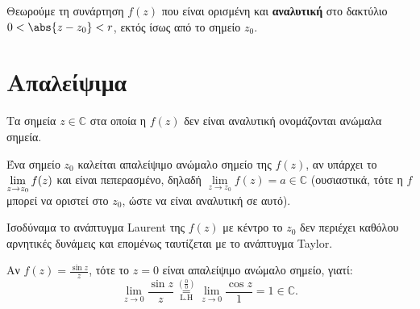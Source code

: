 




\everymath{\displaystyle}
\thispagestyle{empty}







\begin{center}
  \minibox{\large\bfseries \textcolor{Col1}{Ανώμαλα Σημεία}}
\end{center}

\vspace{\baselineskip} 

Θεωρούμε τη συνάρτηση $f(z)$ που είναι ορισμένη και \textbf{αναλυτική} στο δακτύλιο 
$0<\abs{z-z_0}<r$, εκτός ίσως από το σημείο $z_0$. 


\section*{Απαλείψιμα}

\begin{dfn}
  Τα σημεία $z\in \mathbb{C}$ στα οποία η $f(z)$ δεν είναι αναλυτική ονομάζονται 
  \textcolor{Col1}{ανώμαλα} σημεία.
\end{dfn}

\begin{dfn} 
  Ένα σημείο $z_0$ καλείται \textcolor{Col1}{απαλείψιμο} ανώμαλο σημείο της $f(z)$, 
  αν υπάρχει το $\lim\limits_{\smash{z\to z_0}}f(z)$ και είναι πεπερασμένο, 
  δηλαδή $\lim\limits_{z\to z_0}f(z)=a\in \mathbb{C}$ (ουσιαστικά, τότε η $f$
  μπορεί να οριστεί στο $z_{0}$, ώστε να είναι αναλυτική σε αυτό).

  \begin{myitemize}
    \item Ισοδύναμα το ανάπτυγμα Laurent της $f(z)$ \textcolor{Col2}{με κέντρο το $z_0$} 
      δεν περιέχει καθόλου αρνητικές δυνάμεις και επομένως ταυτίζεται με το ανάπτυγμα 
      Taylor.
  \end{myitemize} 
\end{dfn}

\begin{example}
  Αν $f(z)=\frac{\sin z}{z}$, τότε το $z=0$ είναι απαλείψιμο ανώμαλο σημείο, γιατί:
  \[
    \lim\limits_{z\to 0}\frac{\sin z}{z} 
    \overset{(\frac{0}{0})}{\underset{\text{L.H}}{=}} 
    \lim\limits_ {z\to 0}\frac{\cos z}{1}=1\in \mathbb{C}.
  \]
\end{example}

